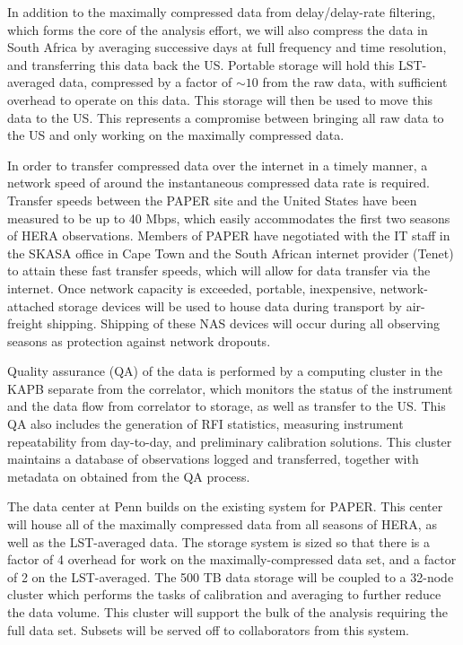 \documentclass[preprint]{aastex}
\begin{document}
In addition to the maximally compressed data from delay/delay-rate
filtering, which forms the core of the analysis effort, we will also
compress the data in South Africa by averaging successive days at full
frequency and time resolution, and transferring this data back the US.
Portable storage will hold this LST-averaged data, compressed by a
factor of $\sim 10$ from the raw data, with sufficient overhead to
operate on this data.  This storage will then be used to move this
data to the US.  This represents a compromise between bringing all raw
data to the US and only working on the maximally compressed data.

In order to transfer compressed data over the internet in a timely
manner, a network speed of around the instantaneous compressed data
rate is required. Transfer speeds between the PAPER site and the
United States have been measured to be up to 40 Mbps, which easily
accommodates the first two seasons of HERA observations. Members of
PAPER have negotiated with the IT staff in the SKASA office in Cape
Town and the South African internet provider (Tenet) to attain
these fast transfer speeds, which will allow for data transfer via the
internet. Once network capacity is exceeded, portable, inexpensive,
network-attached storage devices will be used to house data during
transport by air-freight shipping. Shipping of these NAS devices will
occur during all observing seasons as protection against network
dropouts.

Quality assurance (QA) of the data is performed by a computing cluster
in the KAPB separate from the correlator, which monitors the status of
the instrument and the data flow from correlator to storage, as well
as transfer to the US.  This QA also includes the generation of RFI
statistics, measuring instrument repeatability from day-to-day, 
and preliminary calibration solutions.  This cluster maintains a
database of observations logged and transferred, together with
metadata on obtained from the QA process.


The data center at Penn builds on the existing system for PAPER.  This
center will house all of the maximally compressed data from all
seasons of HERA, as well as the LST-averaged data.  The storage system
is sized so that there is a factor of 4 overhead for work on the
maximally-compressed data set, and a factor of 2 on the LST-averaged.
The 500 TB data storage will be coupled to a 32-node cluster which
performs the tasks of calibration and averaging to further reduce the
data volume.  This cluster will support the bulk of the analysis
requiring the full data set.  Subsets will be served off to
collaborators from this system.
\end{document}
